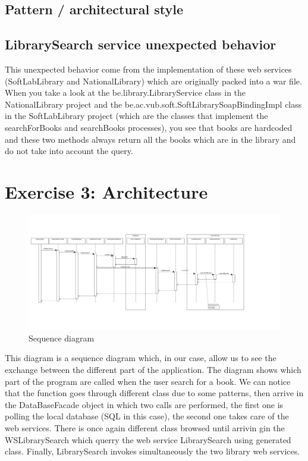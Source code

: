\documentclass[a4paper,10pt]{article}
\begin{document}
\subsection{Pattern / architectural style}

\subsection{LibrarySearch service unexpected behavior}
This unexpected behavior come from the implementation of these web services (SoftLabLibrary and NationalLibrary) which are originally packed into a war file. When you take a look at the be.library.LibraryService class in the NationalLibrary project and the be.ac.vub.soft.SoftLibrarySoapBindingImpl class in the SoftLabLibrary project (which are the classes that implement the searchForBooks and searchBooks processes), you see that books are hardcoded and these two methods always return all the books which are in the library and do not take into account the query.


\section{Exercise 3: Architecture}
\clearpage
\begin{landscape}
\begin{figure}[h]
   \includegraphics[scale=0.4]{uml/sequence.png}
   \caption{\label{sequence} Sequence diagram}
\end{figure}
\end{landscape}
This diagram is a sequence diagram which, in our case, allow us to see the exchange between the different part of the application. The diagram shows which part of the program are called when the user search for a book. We can notice that the function goes through different class due to some patterns, then arrive in the DataBaseFacade object in which two calls are performed, the first one is polling the local database (SQL in this case), the second one takes care of the web services. There is once again different class browsed until arrivin gin the WSLibrarySearch which querry the web service LibrarySearch using generated class. Finally, LibrarySearch invokes simultaneously the two library web services.
\end{document}
